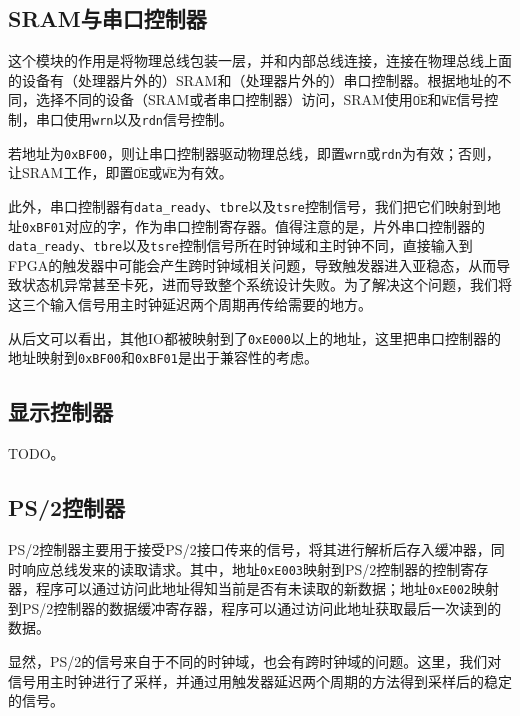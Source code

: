 \documentclass[11pt,utf8]{report}
\begin{document}
\subsection{SRAM与串口控制器}
	\par 这个模块的作用是将物理总线包装一层，并和内部总线连接，连接在物理总线上面的设备有（处理器片外的）SRAM和（处理器片外的）串口控制器。根据地址的不同，选择不同的设备（SRAM或者串口控制器）访问，SRAM使用\texttt{$\mathtt{\overline{OE}}\mbox{和}\mathtt{\overline{WE}}$}信号控制，串口使用\texttt{wrn}以及\texttt{rdn}信号控制。
	\par 若地址为\texttt{0xBF00}，则让串口控制器驱动物理总线，即置\texttt{wrn}或\texttt{rdn}为有效；否则，让SRAM工作，即置\texttt{$\mathtt{\overline{OE}}\mbox{或}\mathtt{\overline{WE}}$}为有效。
	
	\par 此外，串口控制器有\texttt{data\_ready}、\texttt{tbre}以及\texttt{tsre}控制信号，我们把它们映射到地址\texttt{0xBF01}对应的字，作为串口控制寄存器。值得注意的是，片外串口控制器的\texttt{data\_ready}、\texttt{tbre}以及\texttt{tsre}控制信号所在时钟域和主时钟不同，直接输入到FPGA的触发器中可能会产生跨时钟域相关问题，导致触发器进入亚稳态，从而导致状态机异常甚至卡死，进而导致整个系统设计失败。为了解决这个问题，我们将这三个输入信号用主时钟延迟两个周期再传给需要的地方。
	
	\par 从后文可以看出，其他IO都被映射到了\texttt{0xE000}以上的地址，这里把串口控制器的地址映射到\texttt{0xBF00}和\texttt{0xBF01}是出于兼容性的考虑。

\subsection{显示控制器}
	\par TODO。

\subsection{PS/2控制器}
	PS/2控制器主要用于接受PS/2接口传来的信号，将其进行解析后存入缓冲器，同时响应总线发来的读取请求。其中，地址\texttt{0xE003}映射到PS/2控制器的控制寄存器，程序可以通过访问此地址得知当前是否有未读取的新数据；地址\texttt{0xE002}映射到PS/2控制器的数据缓冲寄存器，程序可以通过访问此地址获取最后一次读到的数据。

	显然，PS/2的信号来自于不同的时钟域，也会有跨时钟域的问题。这里，我们对信号用主时钟进行了采样，并通过用触发器延迟两个周期的方法得到采样后的稳定的信号。
\end{document}
